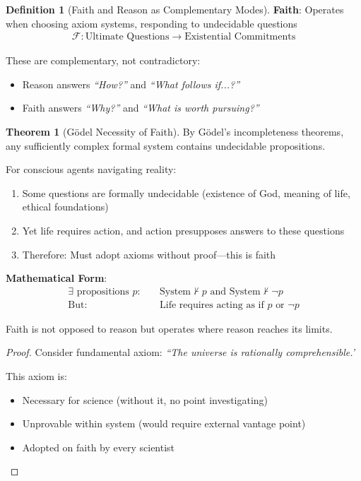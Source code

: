 \documentclass[11pt,a4paper]{article}
\theoremstyle{definition}
\newtheorem{definition}{Definition}[section]
\newtheorem{theorem}{Theorem}[section]
\theoremstyle{remark}
\begin{document}
\begin{small}
\begin{enumerate}
\begin{definition}[Faith and Reason as Complementary Modes]
\textbf{Faith}: Operates when choosing axiom systems, responding to undecidable questions
\begin{align}
\mathcal{F}: \text{Ultimate Questions} \to \text{Existential Commitments}
\end{align}

These are complementary, not contradictory:
\begin{itemize}
    \item Reason answers \textit{``How?''} and \textit{``What follows if...?''}
    \item Faith answers \textit{``Why?''} and \textit{``What is worth pursuing?''}
\end{itemize}
\end{definition}

\begin{theorem}[Gödel Necessity of Faith]
By Gödel's incompleteness theorems, any sufficiently complex formal system contains undecidable propositions.

For conscious agents navigating reality:
\begin{enumerate}
    \item Some questions are formally undecidable (existence of God, meaning of life, ethical foundations)
    \item Yet life requires action, and action presupposes answers to these questions
    \item Therefore: Must adopt axioms without proof—this is faith
\end{enumerate}

\textbf{Mathematical Form}:
\begin{align}
\exists \text{ propositions } p: \quad &\text{System} \nvdash p \text{ and } \text{System} \nvdash \neg p \\
\text{But: } &\text{Life requires acting as if } p \text{ or } \neg p
\end{align}

Faith is not opposed to reason but operates where reason reaches its limits.
\end{theorem}

\begin{proof}
Consider fundamental axiom: \textit{``The universe is rationally comprehensible.'}

This axiom is:
\begin{itemize}
    \item Necessary for science (without it, no point investigating)
    \item Unprovable within system (would require external vantage point)
    \item Adopted on faith by every scientist
\end{itemize}


\end{proof}
\end{enumerate}
\end{small}
\end{document}
